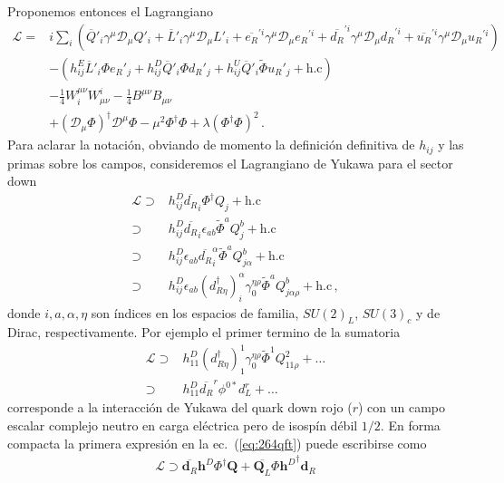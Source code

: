 \begin{frame}
Proponemos entonces el Lagrangiano
\begin{align}
\label{eq:265qft} 
    \mathcal{L}=&i\sum_i\left(\overline{Q}'_i\gamma^\mu\mathcal{D}_\mu Q'_i+\overline{L}'_i\gamma^\mu\mathcal{D}_\mu L'_i+
\overline{e_R}^{\prime i}\gamma^\mu\mathcal{D}_\mu {e_R}^{\prime i}+\overline{d_R}^{\prime i}\gamma^\mu\mathcal{D}_\mu {d_R}^{\prime i}+\overline{u_R}^{\prime i}\gamma^\mu\mathcal{D}_\mu {u_R}^{\prime i}\right)
\nonumber\\
     &-(h_{ij}^E\overline{L}'_i\Phi {e_R}'_j+h_{ij}^D\overline{Q}'_i\Phi {d_R}'_j+h_{ij}^U\overline{Q}'_i\widetilde{\Phi}{u_R}'_j+\text{h.c})\nonumber\\
     &-\tfrac{1}{4}W^{\mu\nu}_i W_{\mu\nu}^i-\tfrac{1}{4}B^{\mu\nu} B_{\mu\nu}\nonumber\\
     &+(\mathcal{D}_\mu\Phi)^\dagger\mathcal{D}^\mu\Phi-\mu^2\Phi^\dagger\Phi+\lambda(\Phi^\dagger\Phi)^2\,.
\end{align}
Para aclarar la notación, obviando de momento la definición definitiva de $h_{ij}$ y las primas sobre los campos, consideremos el Lagrangiano de Yukawa para el sector down
\begin{align}
  \label{eq:264qft}
  \mathcal{L}\supset&h^D_{ij}\overline{d_R}_i\Phi^\dagger Q_j+\text{h.c}\nonumber\\
\supset&h^D_{ij}\overline{d_R}_i\epsilon_{ab}\widetilde{\Phi}^aQ_j^b+\text{h.c}\nonumber\\
\supset&h^D_{ij}\epsilon_{ab}\overline{d_R}_i^\alpha\widetilde{\Phi}^aQ_{j\alpha}^b+\text{h.c}\nonumber\\
\supset&h^D_{ij}\epsilon_{ab}{(d_{R\eta}^\dagger)}_i^\alpha\gamma_0^{\eta\rho}\widetilde{\Phi}^aQ_{j\alpha\rho}^b+\text{h.c}\,,
\end{align}
donde $i,a,\alpha,\eta$ son índices en los espacios de familia, $SU(2)_L$, $SU(3)_c$ y de Dirac, respectivamente. Por ejemplo el primer termino de la sumatoria 
\begin{align}
\mathcal{L}\supset&h^D_{11}{(d_{R\eta}^\dagger)}_1^1\gamma_0^{\eta\rho}\widetilde{\Phi}^1Q_{11\rho}^2+\ldots\nonumber\\
\supset&h^D_{11}\overline{d_R}^r\phi^{0*}d_{L}^r+\ldots\,
\end{align}
corresponde a la interacción de Yukawa del quark down rojo ($r$) con un campo escalar complejo neutro en carga eléctrica pero de isospín débil $1/2$. En forma compacta la primera expresión en la ec.~(\ref{eq:264qft}) puede escribirse como
\begin{align}
  \mathcal{L}\supset\overline{\mathbf{d}_R} \mathbf{h}^D \Phi^\dagger \mathbf{Q}+\overline{\mathbf{Q}_L}\Phi{\mathbf{h}^{D}}^\dagger  \mathbf{d}_R

\end{align}
\end{frame}
